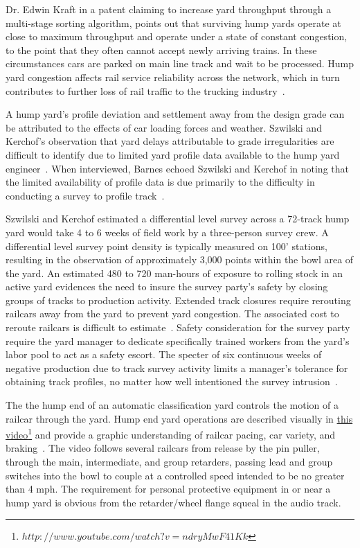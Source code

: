 Dr. Edwin Kraft in a patent claiming to increase yard throughput through a multi-stage sorting algorithm, points out that surviving hump yards operate at close to maximum throughput and operate under a state of constant congestion, to the point that they often cannot accept newly arriving trains. In these circumstances cars are parked on main line track and wait to be processed. Hump yard congestion affects rail service reliability across the network, which in turn contributes to further loss of rail traffic to the trucking industry~\citep{KraftPaten00}.

A hump yard's profile deviation and settlement away from the design grade can be attributed to the effects of car loading forces and weather. Szwilski and Kerchof's observation that yard delays attributable to grade irregularities are difficult to identify due to limited yard profile data available to the hump yard engineer~\citep{2005szwilski}. When interviewed, Barnes echoed Szwilski and Kerchof in noting that the limited availability of profile data is due primarily to the difficulty in conducting a survey to profile track~\citep{2007barnes}.

Szwilski and Kerchof estimated a differential level survey across a 72-track hump yard would take 4 to 6 weeks of field work by a three-person survey crew. A differential level survey point density is typically measured on 100' stations, resulting in the observation of approximately 3,000 points within the bowl area of the yard. An estimated 480 to 720 man-hours of exposure to rolling stock in an active yard evidences the need to insure the survey party's safety by closing groups of tracks to production activity. Extended track closures require rerouting railcars away from the yard to prevent yard congestion. The associated cost to reroute railcars is difficult to estimate~\citep{2005szwilski_kerchof}. Safety consideration for the survey party require the yard manager to dedicate specifically trained workers from the yard's labor pool to act as a safety escort. The specter of six continuous weeks of negative production due to track survey activity limits a manager's tolerance for obtaining track profiles, no matter how well intentioned the survey intrusion~\citep{2007barnes}.

The the hump end of an automatic classification yard controls the motion of a railcar through the yard. Hump end yard operations are described visually in \href{http://www.youtube.com/watch?v=ndryMwF41Kk}{this video}\footnote{$http://www.youtube.com/watch?v=ndryMwF41Kk$} and provide a graphic understanding of railcar pacing, car variety, and braking~\citep{HumpOpsVid}. The video follows several railcars from release by the pin puller, through the main, intermediate, and group retarders, passing lead and group switches into the bowl to couple at a controlled speed intended to be no greater than 4 mph. The requirement for personal protective equipment in or near a hump yard is obvious from the retarder/wheel flange squeal in the audio track.


